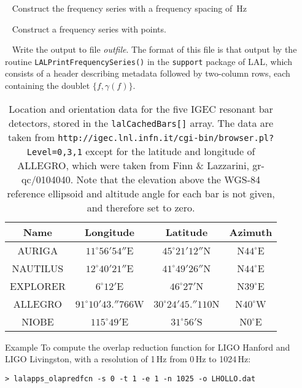\begin{entry}
\begin{entry}
\item[\option{-e}~\parm{deltaF}]
Construct the frequency series with a frequency spacing of
\,Hz

\item[\option{-n}~\parm{numPoints}]
Construct a frequency series with  points.

\item[\option{-o}~\parm{outfile}]
Write the output to file \textit{outfile}. The format of this file is
that output by the routine \texttt{LALPrintFrequencySeries()} in the
\texttt{support} package of LAL, which consists of a header describing
metadata followed by two-column rows, each containing the doublet
$\{f,\gamma(f)\}$.
\end{entry}

\begin{table}[tbp]
\begin{center}
\begin{tabular}{|c|c|c|c|} \hline
Name & Longitude & Latitude & Azimuth \\\hline
AURIGA & $11^\circ56'54''$E & $45^\circ21'12''$N & N$44^\circ$E \\\hline
NAUTILUS & $12^\circ40'21''$E & $41^\circ49'26''$N & N$44^\circ$E \\\hline
EXPLORER & $6^\circ12'$E & $46^\circ27'$N & N$39^\circ$E \\\hline
ALLEGRO & $91^\circ10'43.\!\!''766$W & $30^\circ24'45.\!\!''110$N & N$40^\circ$W \\\hline
NIOBE & $115^\circ49'$E & $31^\circ56'$S & N$0^\circ$E \\\hline
\end{tabular}
\caption{Location and orientation data for the five IGEC resonant bar
detectors, stored in the \texttt{lalCachedBars[]} array. The data are
taken from
\texttt{http://igec.lnl.infn.it/cgi-bin/browser.pl?Level=0,3,1}
except for the latitude and longitude of ALLEGRO, which were taken from
Finn \& Lazzarini, gr-qc/0104040.  Note that the elevation above the
WGS-84 reference ellipsoid and altitude angle for each bar is not given,
and therefore set to zero.}
\label{table:cachedBars}
\end{center}
\end{table}

\item[Example]
To compute the overlap reduction function for LIGO Hanford and LIGO
Livingston, with a resolution of 1\,Hz from 0\,Hz to 1024\,Hz:

\begin{verbatim}
> lalapps_olapredfcn -s 0 -t 1 -e 1 -n 1025 -o LHOLLO.dat
\end{verbatim}
  

\end{entry}
